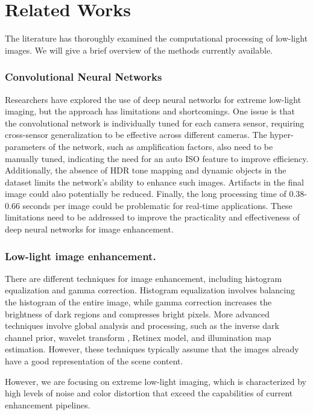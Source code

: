 \documentclass{article}
\begin{document}
\section{Related Works}

The literature has thoroughly examined the computational processing of low-light images. We will give a brief overview of the methods currently available.

\subsubsection{Convolutional Neural Networks} 
Researchers have explored the use of deep neural networks for extreme low-light imaging, but the approach has limitations and shortcomings. One issue is that the convolutional network\cite{LearningToSeeInTheDark} is individually tuned for each camera sensor, requiring cross-sensor generalization to be effective across different cameras. The hyper-parameters of the network, such as amplification factors, also need to be manually tuned, indicating the need for an auto ISO feature to improve efficiency. Additionally, the absence of HDR tone mapping and dynamic objects in the dataset limits the network's ability to enhance such images. Artifacts in the final image could also potentially be reduced. Finally, the long processing time of 0.38-0.66 seconds per image could be problematic for real-time applications. These limitations need to be addressed to improve the practicality and effectiveness of deep neural networks for image enhancement.

\subsubsection{Low-light image enhancement.}

There are different techniques for image enhancement, including histogram equalization and gamma correction. Histogram equalization involves balancing the histogram of the entire image, while gamma correction increases the brightness of dark regions and compresses bright pixels. More advanced techniques involve global analysis and processing, such as the inverse dark channel prior, wavelet transform \cite{AutomaticContrastEnhancement}, Retinex model\cite{retinex}, and illumination map estimation\cite{illumest}. However, these techniques typically assume that the images already have a good representation of the scene content.

However, we are focusing on extreme low-light imaging, which is characterized by high levels of noise and color distortion that exceed the capabilities of current enhancement pipelines.
\end{document}
